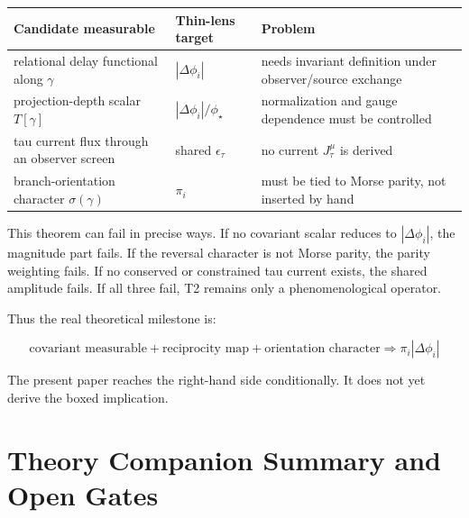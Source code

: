 \documentclass[11pt]{article}
\newcounter{none} %
\begin{document}
{\def\LTcaptype{none} %
\begin{longtable}[]{@{}
  >{\raggedright\arraybackslash}p{}
  >{\raggedright\arraybackslash}p{}
  >{\raggedright\arraybackslash}p{}@{}}
\toprule\noalign{}
\begin{minipage}[b]{\linewidth}\raggedright
Candidate measurable
\end{minipage} & \begin{minipage}[b]{\linewidth}\raggedright
Thin-lens target
\end{minipage} & \begin{minipage}[b]{\linewidth}\raggedright
Problem
\end{minipage} \\
\midrule\noalign{}
\endhead
\bottomrule\noalign{}
\endlastfoot
relational delay functional along \(\gamma\) & \(|\Delta\phi_i|\) &
needs invariant definition under observer/source exchange \\
projection-depth scalar \(T[\gamma]\) & \(|\Delta\phi_i|/\phi_\star\) &
normalization and gauge dependence must be controlled \\
tau current flux through an observer screen & shared \(\epsilon_\tau\) &
no current \(J^\mu_\tau\) is derived \\
branch-orientation character \(\sigma(\gamma)\) & \(\pi_i\) & must be
tied to Morse parity, not inserted by hand \\
\end{longtable}
}

This theorem can fail in precise ways. If no covariant scalar reduces to
\(|\Delta\phi_i|\), the magnitude part fails. If the reversal character
is not Morse parity, the parity weighting fails. If no conserved or
constrained tau current exists, the shared amplitude fails. If all three
fail, T2 remains only a phenomenological operator.

Thus the real theoretical milestone is:

\[
\boxed{
\text{covariant measurable}
+ \text{reciprocity map}
+ \text{orientation character}
\Longrightarrow
\pi_i|\Delta\phi_i|
}
\]

The present paper reaches the right-hand side conditionally. It does not
yet derive the boxed implication.

\section{Theory Companion Summary and Open
Gates}\label{theory-companion-summary-and-open-gates}
\end{document}
